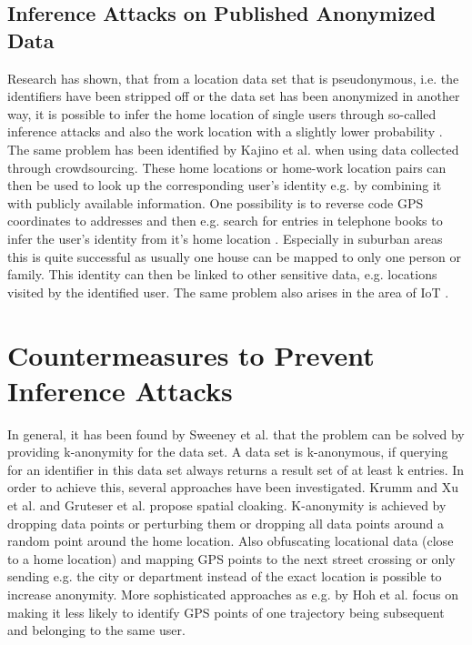 \subsection{Inference Attacks on Published Anonymized Data}
Research has shown, that from a location data set that is pseudonymous, i.e. the identifiers have been stripped off or the data set has been anonymized in another way, it is possible to infer the home location of single users through so-called inference attacks \parencite{krumm, cellphone, privacy-home-work-pairs, hoh2006enhancing, twitter} and also the work location with a slightly lower probability \parencite{cellphone, privacy-home-work-pairs}. The same problem has been identified by Kajino et al. \parencite{crowdsourcing} when using data collected through crowdsourcing.
These home locations or home-work location pairs can then be used to look up the corresponding user's identity e.g. by combining it with publicly available information. One possibility is to reverse code GPS coordinates to addresses and then e.g. search for entries in telephone books to infer the user's identity from it's home location \parencite{krumm, privacy-home-work-pairs, hoh2006enhancing}. Especially in suburban areas this is quite successful as usually one house can be mapped to only one person or family. This identity can then be linked to other sensitive data, e.g. locations visited by the identified user. The same problem also arises in the area of IoT \parencite{iot, hoh2006enhancing}.

\section{Countermeasures to Prevent Inference Attacks}
In general, it has been found by Sweeney et al. \parencite{k-anonymity} that the problem can be solved by providing k-anonymity for the data set. A data set is k-anonymous, if querying for an identifier in this data set always returns a result set of at least k entries.
In order to achieve this, several approaches have been investigated. Krumm \parencite{krumm} and Xu et al. \parencite{xu2018location} and Gruteser et al. \parencite{gruteser2003anonymous} propose spatial cloaking. K-anonymity is achieved by dropping data points or perturbing them or dropping all data points around a random point around the home location. Also obfuscating locational data (close to a home location) and mapping GPS points to the next street crossing or only sending e.g. the city or department instead of the exact location is possible to increase anonymity.
More sophisticated approaches as e.g. by Hoh et al. \parencite{time-to-confusion} focus on making it less likely to identify GPS points of one trajectory being subsequent and belonging to the same user.

